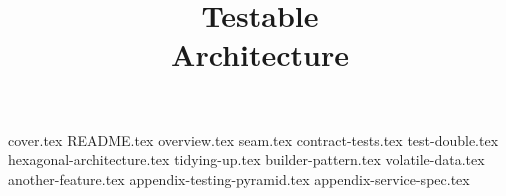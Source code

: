 \documentclass[a4paper,12pt]{report}
\title{Testable\\Architecture}
\begin{document}
{cover.tex}
{README.tex}
{overview.tex}
{seam.tex}
{contract-tests.tex}
{test-double.tex}
{hexagonal-architecture.tex}
{tidying-up.tex}
{builder-pattern.tex}
{volatile-data.tex}
{another-feature.tex}
{appendix-testing-pyramid.tex}
{appendix-service-spec.tex}
\end{document}
